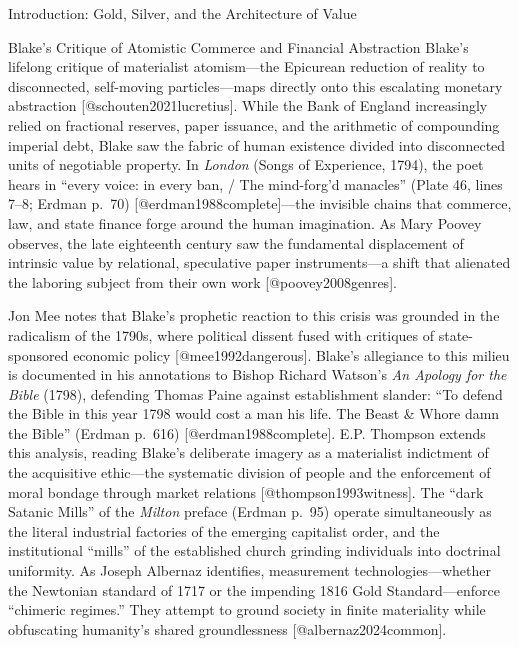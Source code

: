 \documentclass[
  ignorenonframetext,
]{beamer}
\begin{document}
\begin{frame}{Introduction: Gold, Silver, and the Architecture of Value}
\begin{block}{Blake's Critique of Atomistic Commerce and Financial
Abstraction}
\protect{}\label{blakes-critique-of-atomistic-commerce-and-financial-abstraction}
Blake's lifelong critique of materialist atomism---the Epicurean
reduction of reality to disconnected, self-moving particles---maps
directly onto this escalating monetary abstraction
{[}@schouten2021lucretius{]}. While the Bank of England increasingly
relied on fractional reserves, paper issuance, and the arithmetic of
compounding imperial debt, Blake saw the fabric of human existence
divided into disconnected units of negotiable property. In \emph{London}
(Songs of Experience, 1794), the poet hears in ``every voice: in every
ban, / The mind-forg'd manacles'' (Plate 46, lines 7--8; Erdman p.~70)
{[}@erdman1988complete{]}---the invisible chains that commerce, law, and
state finance forge around the human imagination. As Mary Poovey
observes, the late eighteenth century saw the fundamental displacement
of intrinsic value by relational, speculative paper instruments---a
shift that alienated the laboring subject from their own work
{[}@poovey2008genres{]}.

Jon Mee notes that Blake's prophetic reaction to this crisis was
grounded in the radicalism of the 1790s, where political dissent fused
with critiques of state-sponsored economic policy
{[}@mee1992dangerous{]}. Blake's allegiance to this milieu is documented
in his annotations to Bishop Richard Watson's \emph{An Apology for the
Bible} (1798), defending Thomas Paine against establishment slander:
``To defend the Bible in this year 1798 would cost a man his life. The
Beast \& Whore damn the Bible'' (Erdman p.~616)
{[}@erdman1988complete{]}. E.P. Thompson extends this analysis, reading
Blake's deliberate imagery as a materialist indictment of the
acquisitive ethic---the systematic division of people and the
enforcement of moral bondage through market relations
{[}@thompson1993witness{]}. The ``dark Satanic Mills'' of the
\emph{Milton} preface (Erdman p.~95) operate simultaneously as the
literal industrial factories of the emerging capitalist order, and the
institutional ``mills'' of the established church grinding individuals
into doctrinal uniformity. As Joseph Albernaz identifies, measurement
technologies---whether the Newtonian standard of 1717 or the impending
1816 Gold Standard---enforce ``chimeric regimes.'' They attempt to
ground society in finite materiality while obfuscating humanity's shared
groundlessness {[}@albernaz2024common{]}.


\end{block}
\end{frame}
\end{document}
